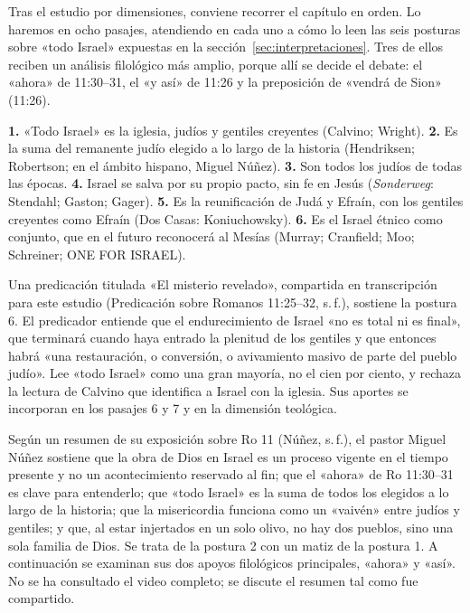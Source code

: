 \documentclass[11pt,letterpaper]{article}
\begin{document}
Tras el estudio por dimensiones, conviene recorrer el capítulo en orden. Lo haremos en ocho pasajes, atendiendo en cada uno a cómo lo leen las seis posturas sobre «todo Israel» expuestas en la sección~\ref{sec:interpretaciones}. Tres de ellos reciben un análisis filológico más amplio, porque allí se decide el debate: el «ahora» de 11:30--31, el «y así» de 11:26 y la preposición de «vendrá de Sion» (11:26).

\begin{nota}
\textbf{1.} «Todo Israel» es la iglesia, judíos y gentiles creyentes (Calvino; Wright). \textbf{2.} Es la suma del remanente judío elegido a lo largo de la historia (Hendriksen; Robertson; en el ámbito hispano, Miguel Núñez). \textbf{3.} Son todos los judíos de todas las épocas. \textbf{4.} Israel se salva por su propio pacto, sin fe en Jesús (\emph{Sonderweg}: Stendahl; Gaston; Gager). \textbf{5.} Es la reunificación de Judá y Efraín, con los gentiles creyentes como Efraín (Dos Casas: Koniuchowsky). \textbf{6.} Es el Israel étnico como conjunto, que en el futuro reconocerá al Mesías (Murray; Cranfield; Moo; Schreiner; ONE FOR ISRAEL).
\end{nota}

\begin{nota}
Una predicación titulada «El misterio revelado», compartida en transcripción para este estudio (Predicación sobre Romanos 11:25--32, s.\,f.), sostiene la postura 6. El predicador entiende que el endurecimiento de Israel «no es total ni es final», que terminará cuando haya entrado la plenitud de los gentiles y que entonces habrá «una restauración, o conversión, o avivamiento masivo de parte del pueblo judío». Lee «todo Israel» como una gran mayoría, no el cien por ciento, y rechaza la lectura de Calvino que identifica a Israel con la iglesia. Sus aportes se incorporan en los pasajes 6 y 7 y en la dimensión teológica.
\end{nota}

\begin{nota}
Según un resumen de su exposición sobre Ro 11 (Núñez, s.\,f.), el pastor Miguel Núñez sostiene que la obra de Dios en Israel es un proceso vigente en el tiempo presente y no un acontecimiento reservado al fin; que el «ahora» de Ro 11:30--31 es clave para entenderlo; que «todo Israel» es la suma de todos los elegidos a lo largo de la historia; que la misericordia funciona como un «vaivén» entre judíos y gentiles; y que, al estar injertados en un solo olivo, no hay dos pueblos, sino una sola familia de Dios. Se trata de la postura 2 con un matiz de la postura 1. A continuación se examinan sus dos apoyos filológicos principales, «ahora» y «así». No se ha consultado el video completo; se discute el resumen tal como fue compartido.
\end{nota}
\end{document}
